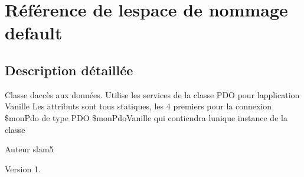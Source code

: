 \hypertarget{namespacedefault}{}\section{Référence de l\textquotesingle{}espace de nommage default}
\label{namespacedefault}


\subsection{Description détaillée}
Classe d\textquotesingle{}accès aux données. Utilise les services de la classe P\+DO pour l\textquotesingle{}application Vanille Les attributs sont tous statiques, les 4 premiers pour la connexion \$mon\+Pdo de type P\+DO \$mon\+Pdo\+Vanille qui contiendra l\textquotesingle{}unique instance de la classe

\begin{DoxyAuthor}{Auteur}
slam5 
\end{DoxyAuthor}
\begin{DoxyVersion}{Version}
1. 
\end{DoxyVersion}
